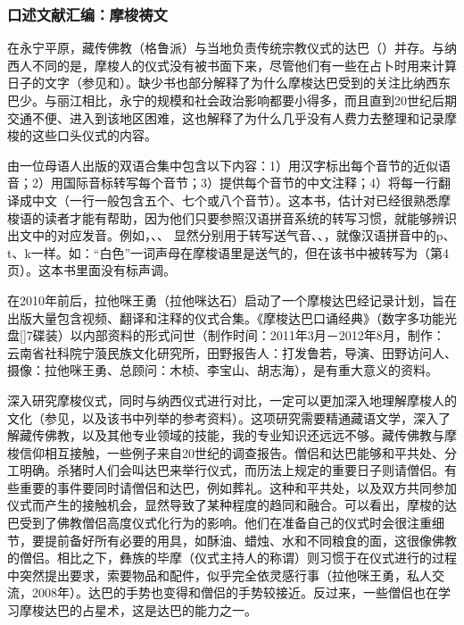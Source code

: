 \subsubsection{口述文献汇编：摩梭祷文}
\label{sec:collectionsoforalliteraturenaritualtexts}
在永宁平原，藏传佛教（格鲁派）与当地负责传统宗教仪式的达巴（）并存。与纳西人不同的是，摩梭人的仪式没有被书面下来，尽管他们有一些在占卜时用来计算日子的文字（参见\textcite{yang1985}和\textcite[163-189]{lidazhu2015}）。缺少书也部分解释了为什么摩梭达巴受到的关注比纳西东巴少。与丽江相比，永宁的规模和社会政治影响都要小得多，而且直到20世纪后期交通不便、进入到该地区困难，这也解释了为什么几乎没有人费力去整理和记录摩梭的这些口头仪式的内容。

由一位母语人出版的双语合集中\parencite{azeming2013}包含以下内容：1）用汉字标出每个音节的近似语音；2）用国际音标转写每个音节；3）提供每个音节的中文注释；4）将每一行翻译成中文（一行一般包含五个、七个或八个音节）。这本书，估计对已经很熟悉摩梭语的读者才能有帮助，因为他们只要参照汉语拼音系统的转写习惯，就能够辨识出文中的对应发音。例如，、、
显然分别用于转写送气音、、，就像汉语拼音中的p、t、k一样。如：“白色”一词声母在摩梭语里是送气的，但在该书中被转写为（第4页）。这本书里面没有标声调。

在2010年前后，拉他咪王勇（拉他咪达石）启动了一个摩梭达巴经记录计划，旨在出版大量包含视频、翻译和注释的仪式合集。《摩梭达巴口诵经典》（数字多功能光盘[]7碟装）以内部资料的形式问世（制作时间：2011年3月－2012年8月，制作：云南省社科院宁蒗民族文化研究所，田野报告人：打发鲁若，导演、田野访问人、摄像：拉他咪王勇、总顾问：木桢、李宝山、胡志海），是有重大意义的资料。

深入研究摩梭仪式，同时与纳西仪式进行对比，一定可以更加深入地理解摩梭人的文化（参见\textcite{mathieu2015}，以及该书中列举的参考资料）。这项研究需要精通{藏语}文学，深入了解{藏}传佛教，以及其他专业领域的技能，我的专业知识还远远不够。{藏}传佛教与摩梭信仰相互接触，一些例子来自20世纪的调查报告。僧侣和{达巴}能够和平共处、分工明确。杀猪时人们会叫{达巴}来举行仪式，而历法上规定的重要日子则请僧侣。有些重要的事件要同时请僧侣和{达巴}，例如葬礼。这种和平共处，以及双方共同参加仪式而产生的接触机会，显然导致了某种程度的趋同和融合。可以看出，摩梭的{达巴}受到了佛教僧侣高度仪式化行为的影响。他们在准备自己的仪式时会很注重细节，要提前备好所有必要的用具，如酥油、蜡烛、水和不同粮食的面，这很像佛教的僧侣。相比之下，{彝}族的毕摩（仪式主持人的称谓）则习惯于在仪式进行的过程中突然提出要求，索要物品和配件，似乎完全依灵感行事（拉他咪王勇，私人交流，2008年）。{达巴}的手势也变得和僧侣的手势较接近。反过来，一些僧侣也在学习摩梭达巴的占星术，这是达巴的能力之一。


